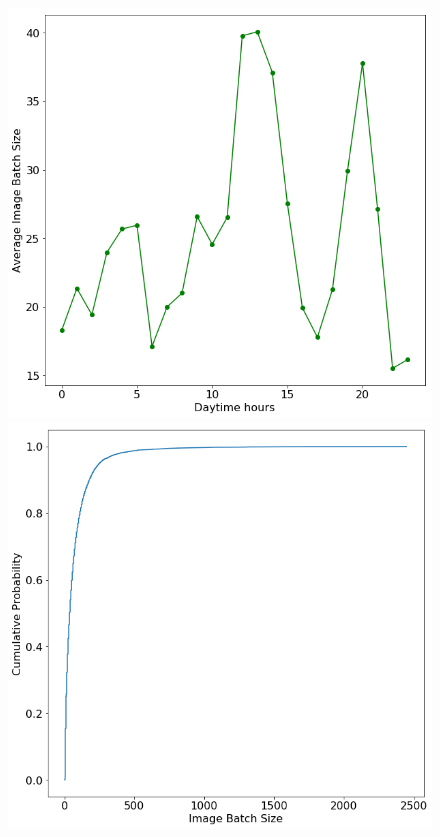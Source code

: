 \begin{figure}
\centering
\begin{minipage}{.45\textwidth}
  \centering
  \includegraphics[width=\linewidth]{figures/Hourly_act.png}
\end{minipage}%
\hspace{0.5in}
\begin{minipage}{.45\textwidth}
  \centering
  \includegraphics[width=\linewidth]{figures/ecdf.png}

\end{minipage}
\end{figure}
